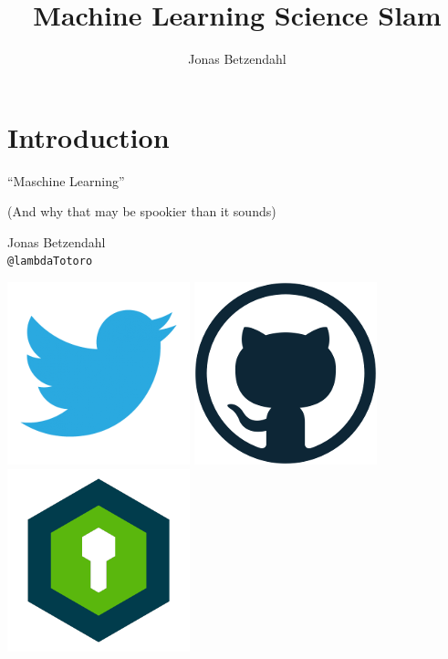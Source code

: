 \documentclass[aspectratio=169,x11names]{beamer}
\author{Jonas Betzendahl}
\title{Machine Learning Science Slam}
\begin{document}
\section{Introduction}

\begin{frame}
\begin{center}
\Large ``Maschine Learning''
\normalsize 

(And why that may be spookier than it sounds)
\bigskip\bigskip

\Large Jonas Betzendahl\\
\texttt{@lambdaTotoro}
\smallskip

\href{https://twitter.com/lambdatotoro}{\includegraphics[scale=0.125]{images/twitter_logo.png}}
\href{https://github.com/jbetzend}{\includegraphics[scale=0.125]{images/github_logo.png}}
\href{https://whispeer.de/en/user/jbetzend}{\includegraphics[scale=0.125]{images/whispeer_logo.png}}
\end{center}
\end{frame}
\end{document}
